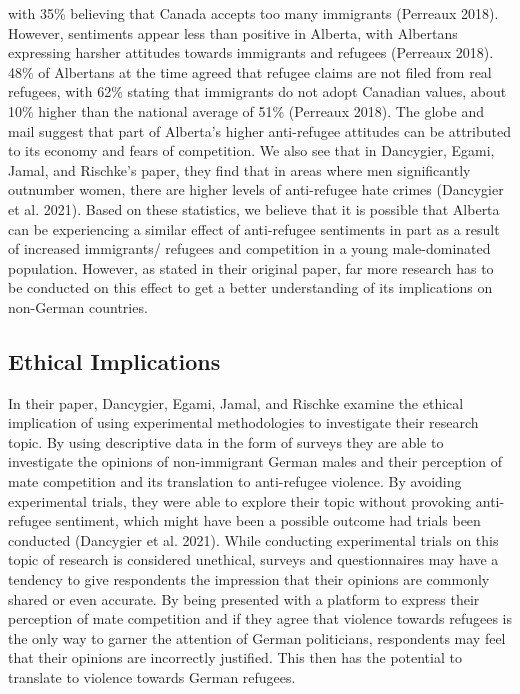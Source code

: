 \documentclass[
]{article}
\begin{document}
with 35\% believing that Canada accepts too many immigrants (Perreaux
2018). However, sentiments appear less than positive in Alberta, with
Albertans expressing harsher attitudes towards immigrants and refugees
(Perreaux 2018). 48\% of Albertans at the time agreed that refugee
claims are not filed from real refugees, with 62\% stating that
immigrants do not adopt Canadian values, about 10\% higher than the
national average of 51\% (Perreaux 2018). The globe and mail suggest
that part of Alberta's higher anti-refugee attitudes can be attributed
to its economy and fears of competition. We also see that in Dancygier,
Egami, Jamal, and Rischke's paper, they find that in areas where men
significantly outnumber women, there are higher levels of anti-refugee
hate crimes (Dancygier et al. 2021). Based on these statistics, we
believe that it is possible that Alberta can be experiencing a similar
effect of anti-refugee sentiments in part as a result of increased
immigrants/ refugees and competition in a young male-dominated
population. However, as stated in their original paper, far more
research has to be conducted on this effect to get a better
understanding of its implications on non-German countries.

\hypertarget{ethical-implications}{%
\subsection{Ethical Implications}\label{ethical-implications}}

In their paper, Dancygier, Egami, Jamal, and Rischke examine the ethical
implication of using experimental methodologies to investigate their
research topic. By using descriptive data in the form of surveys they
are able to investigate the opinions of non-immigrant German males and
their perception of mate competition and its translation to anti-refugee
violence. By avoiding experimental trials, they were able to explore
their topic without provoking anti-refugee sentiment, which might have
been a possible outcome had trials been conducted (Dancygier et al.
2021). While conducting experimental trials on this topic of research is
considered unethical, surveys and questionnaires may have a tendency to
give respondents the impression that their opinions are commonly shared
or even accurate. By being presented with a platform to express their
perception of mate competition and if they agree that violence towards
refugees is the only way to garner the attention of German politicians,
respondents may feel that their opinions are incorrectly justified. This
then has the potential to translate to violence towards German refugees.
\end{document}
